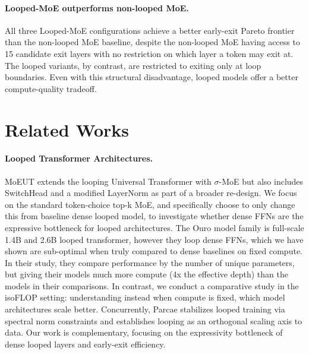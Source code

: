 \documentclass{article}
\begin{document}
\paragraph{Looped-MoE outperforms non-looped MoE.} All three Looped-MoE configurations achieve a better early-exit Pareto frontier than the non-looped MoE baseline, despite the non-looped MoE having access to 15 candidate exit layers with no restriction on which layer a token may exit at. The looped variants, by contrast, are restricted to exiting only at loop boundaries. Even with this structural disadvantage, looped models offer a better compute-quality tradeoff.


\section{Related Works}
\paragraph{Looped Transformer Architectures.} MoEUT \citep{csordas_moeut_nodate} extends the looping Universal Transformer with $\sigma$-MoE \citep{csordas_approximating_2023} but also includes SwitchHead \citep{csordas_switchhead_2024} and a modified LayerNorm \citep{ba_layer_2016} as part of a broader re-design. We focus on the standard token-choice top-k MoE, and specifically choose to only change this from baseline dense looped model, to investigate whether dense FFNs are the expressive bottleneck for looped architectures. The Ouro model family \citep{zhu_scaling_2025} is full-scale 1.4B and 2.6B looped transformer, however they loop dense FFNs, which we have shown are sub-optimal when truly compared to dense baselines on fixed compute. In their study, they compare performance by the number of unique parameters, but giving their models much more compute (4x the effective depth) than the models in their comparisons. In contrast, we conduct a comparative study in the isoFLOP setting: understanding instead when compute is fixed, which model architectures scale better. Concurrently, Parcae \citep{prairie_parcae_2026} stabilizes looped training via spectral norm constraints and establishes looping as an orthogonal scaling axis to data. Our work is complementary, focusing on the expressivity bottleneck of dense looped layers and early-exit efficiency.
\end{document}
